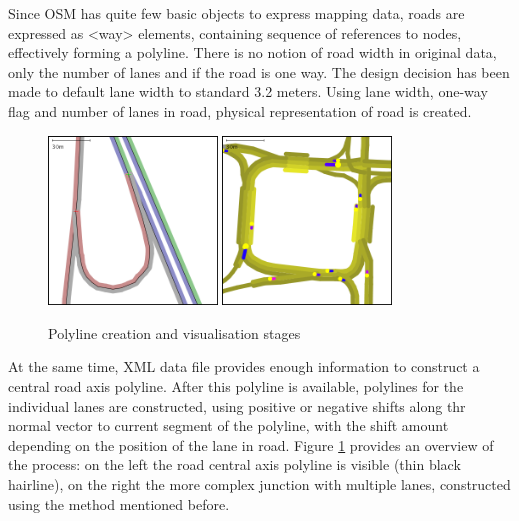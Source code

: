  Since OSM has quite few basic objects to express mapping data, roads are expressed as <way> elements, containing sequence of references to nodes, effectively forming a polyline. There is no notion of road width in original data, only the number of lanes and if the road is one way. The design decision has been made to default lane width to standard 3.2 meters. Using lane width, one-way flag and number of lanes in road, physical representation of road is created.

\begin{figure}[h]
    \caption{Polyline creation and visualisation stages}
    \label{fig:roadAndLanesPolylines}
    \centering
    \includegraphics[width=0.4\textwidth]{figs/road/road_polyline.png}
    \hspace{0.2em}
    \includegraphics[width=0.4\textwidth]{figs/road/road_lanes.png}
\end{figure}

At the same time, XML data file provides enough information to construct a central road axis polyline. After this polyline is available, polylines for the individual lanes are constructed, using positive or negative shifts along thr normal vector to current segment of the polyline, with the shift amount depending on the position of the lane in road. Figure \ref{fig:roadAndLanesPolylines} provides an overview of the process: on the left the road central axis polyline is visible (thin black hairline), on the right the more complex junction with multiple lanes, constructed using the method mentioned before.

